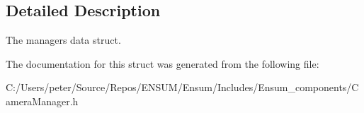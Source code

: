 \subsection{Detailed Description}
The managers data struct. 

The documentation for this struct was generated from the following file\+:\begin{DoxyCompactItemize}
\item 
C\+:/\+Users/peter/\+Source/\+Repos/\+E\+N\+S\+U\+M/\+Ensum/\+Includes/\+Ensum\+\_\+components/Camera\+Manager.\+h\end{DoxyCompactItemize}
